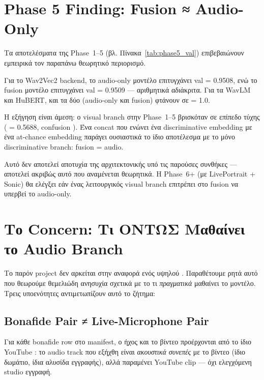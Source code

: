 \section{Phase 5 Finding: Fusion ≈ Audio-Only}
\label{sec:fusion-approx-audio}

Τα αποτελέσματα της Phase~1–5
(βλ. Πίνακα~\ref{tab:phase5_val})
επιβεβαιώνουν εμπειρικά τον παραπάνω θεωρητικό περιορισμό.

Για το Wav2Vec2 backend,
το audio-only μοντέλο επιτυγχάνει val \AUC{} = 0.9508,
ενώ το fusion μοντέλο επιτυγχάνει val \AUC{} = 0.9509 —
αριθμητικά αδιάκριτα.
Για τα WavLM και HuBERT,
και τα δύο (audio-only και fusion) φτάνουν σε \AUC{} = 1.0.

Η εξήγηση είναι άμεση:
ο visual branch στην Phase~1–5 βρισκόταν σε επίπεδο τύχης
(\AUC{} = 0.5688, confusion ).
Ένα concat που ενώνει ένα discriminative embedding
με ένα at-chance embedding
παράγει ουσιαστικά το ίδιο αποτέλεσμα με το μόνο discriminative branch:
fusion = audio.

Αυτό δεν αποτελεί αποτυχία της αρχιτεκτονικής υπό τις παρούσες συνθήκες —
αποτελεί ακριβώς αυτό που αναμένεται θεωρητικά.
Η Phase~6+ (με LivePortrait + Sonic) θα ελέγξει
εάν ένας λειτουργικός visual branch επιτρέπει
στο fusion να υπερβεί το audio-only.

\section{Το Concern: Τι ΟΝΤΩΣ Μαθαίνει το Audio Branch}
\label{sec:concern}

Το παρόν project δεν αρκείται στην αναφορά ενός υψηλού \AUC{}.
Παραθέτουμε ρητά αυτό που θεωρούμε θεμελιώδη ανησυχία
σχετικά με το τι \emph{πραγματικά} μαθαίνει το μοντέλο.
Τρεις υποενότητες αντιμετωπίζουν αυτό το ζήτημα:

\subsection{Bonafide Pair ≠ Live-Microphone Pair}
\label{subsec:bonafide-pair}

Για κάθε bonafide row στο manifest,
ο ήχος και το βίντεο προέρχονται από το ίδιο YouTube :
το audio track που εξήχθη είναι \emph{ακουστικά συνεπές} με το βίντεο
(ίδιο δωμάτιο, ίδια αλυσίδα εγγραφής),
αλλά παραμένει YouTube clip — όχι ελεγχόμενη studio εγγραφή.

